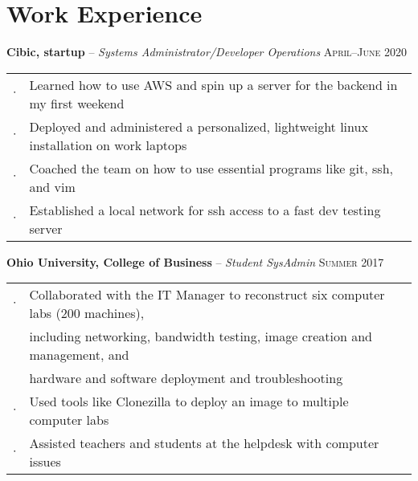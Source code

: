 \documentclass[letterpaper,12pt]{article}
\begin{document}
\section{Work Experience}

\textbf{Cibic, startup} -- \textit{Systems Administrator/Developer Operations} \hfill \textsc{April--June 2020}

\begin{tabular}{rl}
$\cdot$ & Learned how to use AWS and spin up a server for the backend in my first weekend \\
$\cdot$ & Deployed and administered a personalized, lightweight linux installation on work laptops \\
$\cdot$ & Coached the team on how to use essential programs like git, ssh, and vim \\
$\cdot$ & Established a local network for ssh access to a fast dev testing server \\
\end{tabular}

\textbf{Ohio University, College of Business} -- \textit{Student SysAdmin} \hfill \textsc{Summer 2017}

\begin{tabular}{rl}
$\cdot$ & Collaborated with the IT Manager to reconstruct six computer labs (200 machines), \\
        & including networking, bandwidth testing, image creation and management, and \\
        & hardware and software deployment and troubleshooting \\
$\cdot$ & Used tools like Clonezilla to deploy an image to multiple computer labs \\
$\cdot$ & Assisted teachers and students at the helpdesk with computer issues \\
\end{tabular}

%
\end{document}
